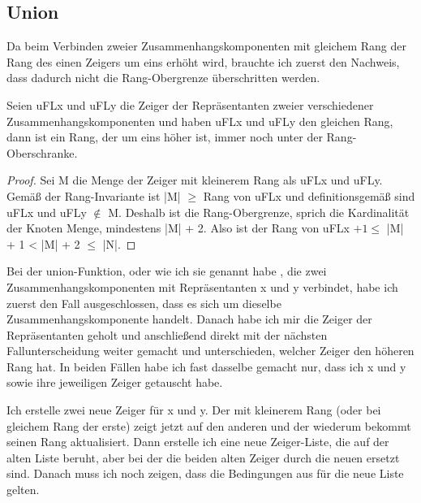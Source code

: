 \subsection{Union}
Da beim Verbinden zweier Zusammenhangskomponenten mit gleichem Rang der Rang des einen Zeigers um eins erhöht wird,
brauchte ich zuerst den Nachweis, dass dadurch nicht die Rang-Obergrenze überschritten werden.

\begin{lemma}[\KruskalunionFindranksuccisLt]
  Seien uFLx und uFLy die Zeiger der Repräsentanten zweier verschiedener Zusammenhangskomponenten
  und haben uFLx und uFLy den gleichen Rang, dann ist ein Rang, der um eins höher ist, immer noch unter der Rang-Oberschranke.
\end{lemma}
\begin{proof}
  Sei M die Menge der Zeiger mit kleinerem Rang als uFLx und uFLy.
  Gemäß der Rang-Invariante ist |M| $\ge$  Rang von uFLx und definitionsgemäß sind uFLx und uFLy $\notin$ M.
  Deshalb ist die Rang-Obergrenze, sprich die Kardinalität der Knoten Menge, mindestens |M| + 2.
  Also ist der Rang von uFLx $+ 1 \le$ |M| + 1 < |M| + 2 $\le$ |N|.
\end{proof}

Bei der union-Funktion, oder wie ich sie genannt habe \KruskalupdateunionFind, die zwei Zusammenhangskomponenten mit Repräsentanten x und y verbindet,
habe ich zuerst den Fall ausgeschlossen, dass es sich um dieselbe Zusammenhangskomponente handelt.
Danach habe ich mir die Zeiger der Repräsentanten geholt und anschließend direkt mit der nächsten Fallunterscheidung weiter gemacht und unterschieden, welcher Zeiger den höheren Rang hat.
In beiden Fällen habe ich fast dasselbe gemacht nur, dass ich x und y sowie ihre jeweiligen Zeiger getauscht habe.

Ich erstelle zwei neue Zeiger für x und y.
Der mit kleinerem Rang (oder bei gleichem Rang der erste) zeigt jetzt auf den anderen und der wiederum bekommt seinen Rang aktualisiert.
Dann erstelle ich eine neue Zeiger-Liste, die auf der alten Liste beruht, aber bei der die beiden alten Zeiger durch die neuen ersetzt sind.
Danach muss ich noch zeigen, dass die Bedingungen aus \KruskalunionFind für die neue Liste gelten.

